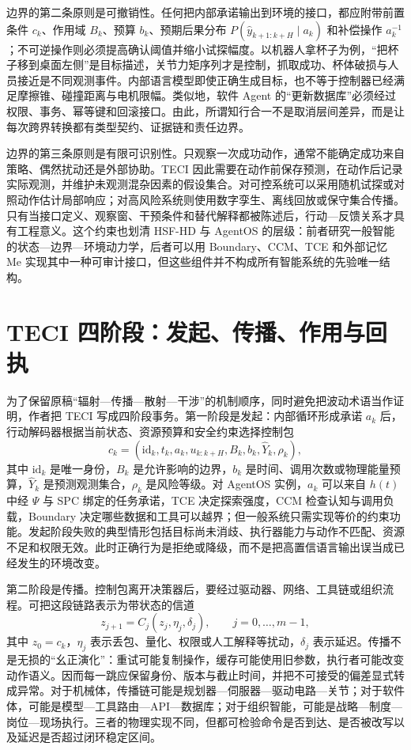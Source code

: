 边界的第二条原则是可撤销性。任何把内部承诺输出到环境的接口，都应附带前置条件 $c_k$、作用域 $B_k$、预算 $b_k$、预期后果分布 $P(\hat y_{k+1:k+H}\mid a_k)$ 和补偿操作 $a_k^{-1}$；不可逆操作则必须提高确认阈值并缩小试探幅度。以机器人拿杯子为例，“把杯子移到桌面左侧”是目标描述，关节力矩序列才是控制，抓取成功、杯体破损与人员接近是不同观测事件。内部语言模型即使正确生成目标，也不等于控制器已经满足摩擦锥、碰撞距离与电机限幅。类似地，软件 Agent 的“更新数据库”必须经过权限、事务、幂等键和回滚接口。由此，所谓知行合一不是取消层间差异，而是让每次跨界转换都有类型契约、证据链和责任边界。

边界的第三条原则是有限可识别性。只观察一次成功动作，通常不能确定成功来自策略、偶然扰动还是外部协助。TECI 因此需要在动作前保存预测，在动作后记录实际观测，并维护未观测混杂因素的假设集合。对可控系统可以采用随机试探或对照动作估计局部响应；对高风险系统则使用数字孪生、离线回放或保守集合传播。只有当接口定义、观察窗、干预条件和替代解释都被陈述后，行动—反馈关系才具有工程意义。这个约束也划清 HSF-HD 与 AgentOS 的层级：前者研究一般智能的状态—边界—环境动力学，后者可以用 Boundary、CCM、TCE 和外部记忆 Me 实现其中一种可审计接口，但这些组件并不构成所有智能系统的先验唯一结构。

\section{TECI 四阶段：发起、传播、作用与回执}
\label{sec:teci_radiation_dynamics}

为了保留原稿“辐射—传播—散射—干涉”的机制顺序，同时避免把波动术语当作证明，作者把 TECI 写成四阶段事务。第一阶段是发起：内部循环形成承诺 $a_k$ 后，行动解码器根据当前状态、资源预算和安全约束选择控制包
\[
c_k=(\mathrm{id}_k,t_k,a_k,u_{k:k+H},B_k,b_k,\widehat Y_k,\rho_k),
\]
其中 $\mathrm{id}_k$ 是唯一身份，$B_k$ 是允许影响的边界，$b_k$ 是时间、调用次数或物理能量预算，$\widehat Y_k$ 是预测观测集合，$\rho_k$ 是风险等级。对 AgentOS 实例，$a_k$ 可以来自 $h(t)$ 中经 $\Psi$ 与 SPC 绑定的任务承诺，TCE 决定探索强度，CCM 检查认知与调用负载，Boundary 决定哪些数据和工具可以越界；但一般系统只需实现等价的约束功能。发起阶段失败的典型情形包括目标尚未消歧、执行器能力与动作不匹配、资源不足和权限无效。此时正确行为是拒绝或降级，而不是把高置信语言输出误当成已经发生的环境改变。

第二阶段是传播。控制包离开决策器后，要经过驱动器、网络、工具链或组织流程。可把这段链路表示为带状态的信道
\[
z_{j+1}=C_j(z_j,\eta_j,\delta_j),\qquad j=0,\ldots,m-1,
\]
其中 $z_0=c_k$，$\eta_j$ 表示丢包、量化、权限或人工解释等扰动，$\delta_j$ 表示延迟。传播不是无损的“幺正演化”：重试可能复制操作，缓存可能使用旧参数，执行者可能改变动作语义。因而每一跳应保留身份、版本与截止时间，并把不可接受的偏差显式转成异常。对于机械体，传播链可能是规划器—伺服器—驱动电路—关节；对于软件体，可能是模型—工具路由—API—数据库；对于组织智能，可能是战略—制度—岗位—现场执行。三者的物理实现不同，但都可检验命令是否到达、是否被改写以及延迟是否超过闭环稳定区间。

